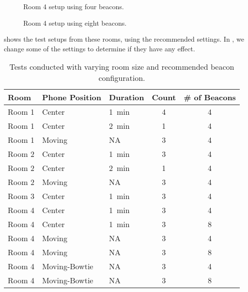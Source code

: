 \begin{figure}[!htb]
    \centering
    \begin{minipage}[b]{0.4\textwidth}
        
        \caption{Room 4 setup using four beacons.}
        \label{fig:bowtie4beacons}
    \end{minipage}
    \quad
    \begin{minipage}[b]{0.4\textwidth}
        
        \caption{Room 4 setup using eight beacons.}
        \label{fig:bowtie8beacons}
    \end{minipage}
\end{figure}

 shows the test setups from these rooms,
using the recommended settings.
In , we change some of the settings to determine if they have any effect.

\begin{table}[!htb]
    \centering
    \begin{tabular}{l| l l c c}
        \hline
        Room   & Phone Position & Duration 	       & Count & \# of Beacons \\ \hline
        Room 1 & Center         & \SI{1}{\minute}  & 4  & 4 \\ 
        Room 1 & Center         & \SI{2}{\minute}  & 1     & 4 \\ 
        Room 1 & Moving         & NA               & 3     & 4 \\
        Room 2 & Center         & \SI{1}{\minute}  & 3     & 4 \\ 
        Room 2 & Center         & \SI{2}{\minute}  & 1     & 4 \\
        Room 2 & Moving         & NA               & 3     & 4 \\ 
        Room 3 & Center         & \SI{1}{\minute}  & 3     & 4 \\ 
        Room 4 & Center         & \SI{1}{\minute}  & 3     & 4 \\ 
        Room 4 & Center         & \SI{1}{\minute}  & 3     & 8 \\ 
        Room 4 & Moving         & NA       & 3     & 4 \\
        Room 4 & Moving         & NA       & 3     & 8 \\
        Room 4 & Moving-Bowtie  & NA       & 3     & 4 \\
        Room 4 & Moving-Bowtie  & NA       & 3     & 8 \\
    \end{tabular}
    \caption{Tests conducted with varying room size and recommended beacon configuration.}
    \label{table:precisiontest:roomsize}
\end{table}


